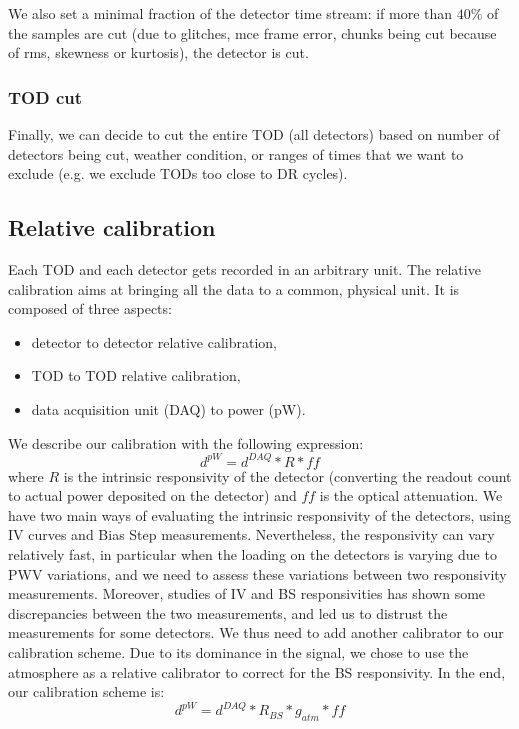 \documentclass[a4paper, 11pt]{article}
\begin{document}
We also set a minimal fraction of the detector time stream: if more than $40\%$ of the samples are cut (due to glitches, mce frame error, chunks being cut because of rms, skewness or kurtosis), the detector is cut.

\subsubsection{TOD cut}
Finally, we can decide to cut the entire TOD (all detectors) based on number of detectors being cut, weather condition, or ranges of times that we want to exclude (e.g. we exclude TODs too close to DR cycles).

\subsection{Relative calibration}
\label{subsec:relcal}
Each TOD and each detector gets recorded in an arbitrary unit. The relative calibration aims at bringing all the data to a common, physical unit. It is composed of three aspects:
\begin{itemize}
	\item detector to detector relative calibration,
	\item TOD to TOD relative calibration,
	\item data acquisition unit (DAQ) to power (pW).
\end{itemize}
We describe our calibration with the following expression:
\begin{equation}
	d^{pW} = d^{DAQ} * R * ff
\end{equation}
where $R$ is the intrinsic responsivity of the detector (converting the readout count to actual power deposited on the detector) and $ff$ is the optical attenuation. We have two main ways of evaluating the intrinsic responsivity of the detectors, using IV curves and Bias Step measurements. Nevertheless, the responsivity can vary relatively fast, in particular when the loading on the detectors is varying due to PWV variations, and we need to assess these variations between two responsivity measurements. Moreover, studies of IV and BS responsivities has shown some discrepancies between the two measurements, and led us to distrust the measurements for some detectors. We thus need to add another calibrator to our calibration scheme. Due to its dominance in the signal, we chose to use the atmosphere as a relative calibrator to correct for the BS responsivity. In the end, our calibration scheme is:
\begin{equation}
\label{eqn_relcal}
	d^{pW} = d^{DAQ} * R_{BS} * g_{atm} * ff
\end{equation}
\end{document}

